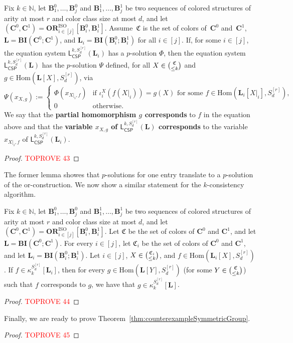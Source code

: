 \documentclass[a4paper,english, thm-restate]{lipics-v2021}
\newcommand{\nat}{\mathbb{N}}
\newcommand{\defining}[1]{\textbf{#1}}
\newcommand{\StructB}{\mathbf{B}}
\newcommand{\StructC}{\mathbf{C}}
\newcommand{\StructL}{\mathbf{L}}
\newcommand{\kcol}[3]{\kappa_{#1}^{#2}[#3]}
\newcommand{\restrict}[2]{#1|_{#2}}
\newcommand{\Hom}[2]{\mathrm{Hom}(#1,#2)}
\newcommand{\leqs}{\mathsf{L}}
\newcommand{\cspiso}[3]{\leqs^{#1,#2}_{\mathsf{CSP}}(#3)}
\newcommand{\bcisosys}[2]{\mathbf{BI}(#1;#2)}
\newcommand{\colors}{\mathfrak{C}}
\newcommand{\CosetGrpTmplt}[2]{#1^{[#2]}}
\newcommand{\Sym}[1]{S_{#1}}
\newcommand{\SymStruct}[2]{\CosetGrpTmplt{\Sym{#1}}{#2}}
\newcommand{\ORISO}[2]{\mathbf{OR}^{\text{ISO}}_{#1}[#2]}
\begin{document}
	\begin{lemma}
		\label{lem:or-construction-p-solution}
		Fix $k \in \nat$, let $\StructB_1^0, \dots, \StructB_j^0$ and $\StructB_1^1,\dots, \StructB_j^1$
		be two sequences of colored structures of arity at most $r$ and color class size at most $d$,
		and let $(\StructC^0, \StructC^1) = \ORISO{i\in [j]} {\StructB_i^0,\StructB_i^1}$.
		Assume~$\colors$ is the set of colors of~$\StructC^0$ and~$\StructC^1$,
		$\StructL = \bcisosys{\StructC^0}{\StructC^1}$, and
		$\StructL_i = \bcisosys{\StructB_i^0}{\StructB_i^1}$ for all $i \in [j]$.
		If, for some $i \in [j]$, 
the equation system $\cspiso{k}{\SymStruct{d}{r}}{\StructL_i}$
		has a $p$-solution $\Phi$,
		then the equation system 
		$\cspiso{k}{\SymStruct{d}{r}}{\StructL}$
		has the  $p$-solution $\Psi$
		defined, for all $X \in \tbinom{\colors}{\leq k}$ and $g \in \Hom{\StructL[X]}{\SymStruct{d}{r}}$,
		via
		\[
		\Psi(x_{X,g}) :=  \begin{cases}
			\Phi(x_{\restrict{X}{i},f}) & \text{if } \iota_i^X(f(X|_i)) = g(X) \text{ for some } f \in \Hom{\StructL_i[\restrict{X}{i}]}{\SymStruct{d}{r}},\\
			0 & \text{otherwise.}
		\end{cases}
		\]
		We say that the \defining{partial homomorphism $g$
			corresponds} to $f$ in the equation above
		and that the \defining{variable $x_{X,g}$ of $\cspiso{k}{\SymStruct{d}{r}}{\StructL}$
			corresponds} to the variable $x_{\restrict{X}{i},f}$
		of $\cspiso{k}{\SymStruct{d}{r}}{\StructL_i}$.
	\end{lemma}
	\begin{proof}\textcolor{red}{TOPROVE 43}\end{proof}
	
	\noindent The former lemma showes that $p$-solutions for one entry translate to a $p$-solution of the or-construction.
	We now show a similar statement for the $k$-consistency algorithm.
	\begin{lemma}
		\label{lem:or-construction-k-consistency}
		Fix $k \in \nat$, let $\StructB_1^0, \dots, \StructB_j^0$ and $\StructB_1^1,\dots, \StructB_j^1$
		be two sequences of colored structures of arity at most $r$ and color class size at most $d$,
		and let $(\StructC^0, \StructC^1) = \ORISO{i\in [j]} {\StructB_i^0,\StructB_i^1}$.
		Let $\colors$ be the set of colors of $\StructC^0$ and $\StructC^1$,
		and let $\StructL = \bcisosys{\StructC^0}{\StructC^1}$.
		For every $i \in [j]$,
		let $\colors_i$ be the set of colors of $\StructC^0$ and $\StructC^1$,
		and let $\StructL_i = \bcisosys{\StructB_i^0}{\StructB_i^1}$.
		Let $i \in [j]$,  $X \in \tbinom{\colors_i}{\leq k}$, and $f \in \Hom{\StructL_i[X]}{\SymStruct{d}{r}}$.
		If $f \in \kcol{k}{\SymStruct{d}{r}}{\StructL_i}$,
		then for every  $g \in \Hom{\StructL[Y]}{\SymStruct{d}{r}}$ (for some $Y \in \tbinom{\colors}{\leq k}$)
		such that $f$ corresponds to $g$,	
we have that $g \in \kcol{k}{\SymStruct{d}{r}}{\StructL}$.
	\end{lemma}
	\begin{proof}\textcolor{red}{TOPROVE 44}\end{proof}
	
	Finally, we are ready to prove Theorem~\ref{thm:counterexampleSymmetricGroup}.
	\begin{proof}\textcolor{red}{TOPROVE 45}\end{proof}
\end{document}

